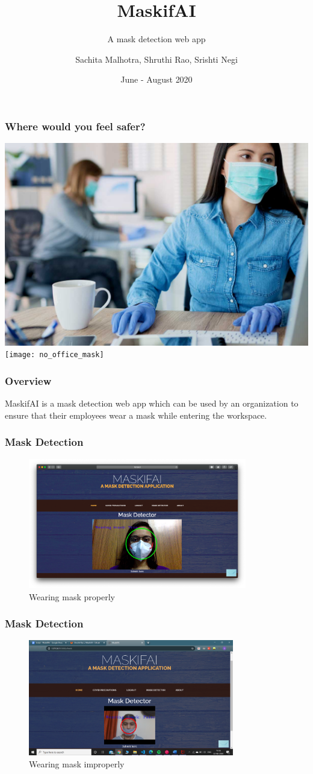 \documentclass[14pt]{beamer}
\title{MaskifAI}
\subtitle{A mask detection web app}
\author[TEAM 6]{Sachita Malhotra, Shruthi Rao, Srishti Negi}
\date{June - August 2020}
\begin{document}
\begin{frame}
    \titlepage
\end{frame}

\begin{frame}
    \frametitle{Where would you feel safer?}
    \centering
    \includegraphics[width=4.5 cm,height=3.5 cm]{office_mask}
    \texttt{[image: no\_office\_mask]}
\end{frame}

\begin{frame}
    \frametitle{Overview}
    MaskifAI is a mask detection web app which can be used by an organization to ensure that their employees wear a mask while entering the workspace.
\end{frame}

\begin{frame}
    \frametitle{Mask Detection}
    \begin{figure}
    \caption{Wearing mask properly}
    \centering
    \includegraphics[width=0.85\textwidth]{mask_true}
    \end{figure}
\end{frame}

\begin{frame}
    \frametitle{Mask Detection}
    \begin{figure}
    \caption{Wearing mask improperly}
    \centering
    \includegraphics[width=0.8\textwidth]{improper_mask}
    \end{figure}
\end{frame}
\end{document}
